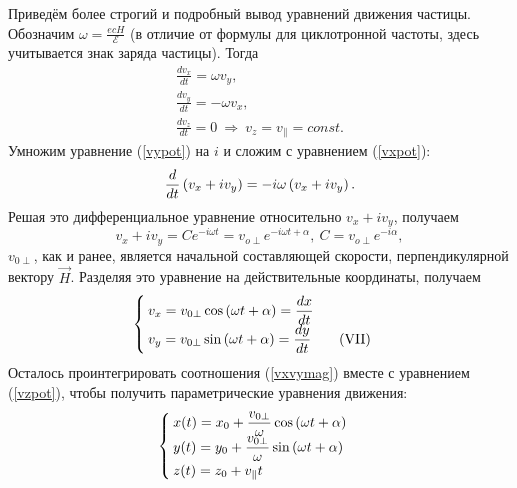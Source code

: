     Приведём более строгий и подробный вывод уравнений движения частицы. Обозначим $\omega = \frac{ecH}{\mathcal{E}}$
    (в отличие от формулы для циклотронной частоты, здесь учитывается знак заряда частицы). Тогда
    \begin{gather}
        \frac{dv_x}{dt} = \omega v_y, \label{vxpot} \\
        \frac{dv_y}{dt} = -\omega v_x, \label{vypot} \\
        \frac{dv_z}{dt} = 0 \: \Rightarrow \: v_z = v_{\parallel} = const. \label{vzpot}
    \end{gather}
    Умножим уравнение (\ref{vypot}) на $i$ и сложим с уравнением (\ref{vxpot}):
    \[
        \frac{d}{dt}\left({v_x + iv_y}\right) = -i\omega\left({v_x + iv_y}\right).
    \]
    Решая это дифференциальное уравнение относительно $v_x + iv_y$, получаем
    \[
        v_x + iv_y = Ce^{-i\omega t} = v_{o\perp}e^{-i\omega t + \alpha}, \: C = v_{o\perp}e^{-i\alpha},
    \]
    $v_{0\perp}$, как и ранее, является начальной составляющей скорости, перпендикулярной вектору $\vec{H}$.
    Разделяя это уравнение на действительные координаты, получаем
    \[ \begin{cases}
        \displaystyle v_x = v_{0\perp}\cos\brackets{\omega t + \alpha} = \frac{dx}{dt} \\
        \displaystyle v_y = v_{0\perp}\sin\brackets{\omega t + \alpha} = \frac{dy}{dt} \tag{\Romannum{7}}\label{vxvymag}
    \end{cases} \]
    Осталось проинтегрировать соотношения (\ref{vxvymag}) вместе с уравнением (\ref{vzpot}), чтобы получить параметрические уравнения движения:
    \[ \begin{cases}
        \displaystyle x(t) = x_0 + \frac{v_{0\perp}}{\omega}\cos\left({\omega t + \alpha}\right) \\
        \displaystyle y(t) = y_0 + \frac{v_{0\perp}}{\omega}\sin\left({\omega t + \alpha}\right) \\
        \displaystyle z(t) = z_0 + v_{\parallel}t
    \end{cases} \]

